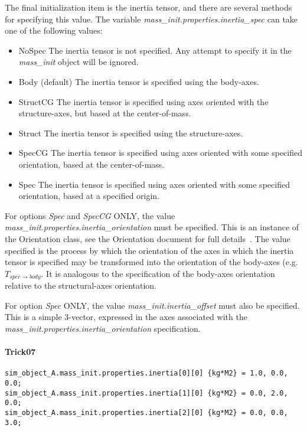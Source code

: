 The final initialization item is the inertia tensor, and there are several
methods for specifying this value.  The variable
\textit{mass\_init.properties.inertia\_spec} can take one of the following
values:
\begin{itemize}
 \item NoSpec         The inertia tensor is not specified.  Any attempt to
 specify it in the \textit{mass\_init} object will be ignored.
 \item Body (default) The inertia tensor is specified using the body-axes.
 \item StructCG       The inertia tensor is specified using axes oriented with
 the structure-axes, but based at the center-of-mass.
 \item Struct  The inertia tensor is specified using the structure-axes.
 \item SpecCG  The inertia tensor is specified using axes oriented with some
 specified orientation, based at the center-of-mass.
 \item Spec    The inertia tensor is specified using axes oriented with some
 specified orientation, based at a specified origin.
\end{itemize}

For options \textit{Spec} and \textit{SpecCG} ONLY, the value
\textit{mass\_init.properties.inertia\_orientation} must be specified.  This
is an instance of the Orientation class, see the Orientation document for full
details~\cite{dynenv:ORIENTATION}.  The value specified is the process by which
the orientation of the axes in which the inertia tensor is specified may be
transformed into the orientation of the body-axes (e.g. $T_{spec \rightarrow
body}$.  It is analogous to the specification of the body-axes orientation
relative to the structural-axes orientation.

For option \textit{Spec} ONLY, the value \textit{mass\_init.inertia\_offset}
must also be specified.  This is a simple 3-vector, expressed in the axes
associated with the \textit{mass\_init.properties.inertia\_orientation}
specification.

\paragraph{Trick07}
\begin{verbatim}
sim_object_A.mass_init.properties.inertia[0][0] {kg*M2} = 1.0, 0.0, 0.0;
sim_object_A.mass_init.properties.inertia[1][0] {kg*M2} = 0.0, 2.0, 0.0;
sim_object_A.mass_init.properties.inertia[2][0] {kg*M2} = 0.0, 0.0, 3.0;
\end{verbatim}

